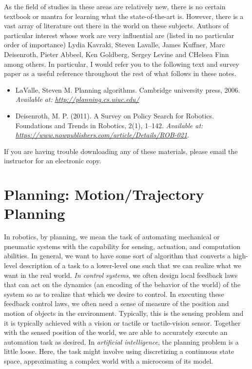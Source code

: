 As the field of studies in these areas are relatively new, there is no certain textbook or mantra for learning what the state-of-the-art is. However, there is a vast array of literature out there in the world on these subjects. Authors of particular interest whose work are very influential are (listed in no particular order of importance) Lydia Kavraki, Steven Lavalle, James Kuffner, Marc Deisenroth, Pieter Abbeel, Ken Goldberg, Sergey Levine and CHelsea Finn among others. In particular, I would refer you to the following text and survey paper as a useful reference throughout the rest of what follows in these notes.
%
\begin{itemize}
	\item LaValle, Steven M. Planning algorithms. Cambridge university press, 2006. \textit{Available at: \href{http://planning.cs.uiuc.edu/}{http://planning.cs.uiuc.edu/}}
	\item Deisenroth, M. P. (2011). A Survey on Policy Search for Robotics. Foundations and Trends in Robotics, 2(1), 1–142. \textit{Available at: \href{https://www.nowpublishers.com/article/Details/ROB-021}{https://www.nowpublishers.com/article/Details/ROB-021}}.
\end{itemize}
%
If you are having trouble downloading any of these materials, please email the instructor for an electronic copy.

\section{Planning: Motion/Trajectory Planning}

In robotics, by planning, we mean the task of automating mechanical or pneumatic systems with the capability for sensing, actuation, and computation abilities. In general, we want to have some sort of algorithm that converts a high-level description of a task to a lower-level one such that we can realize what we want in the real world. \textit{In control systems}, we often design local feedback laws that can act on the dynamics (an encoding of the behavior of the world) of the system so as to realize that which we desire to control. In executing these feedback control laws, we often need a sense of measure of the position and motion of objects in the environment. Typically, this is the sensing problem and it is typically achieved with a vision or tactile or tactile-vision sensor.  Together with the sensed position of the world, we are able to accurately execute an automation task as desired. In \textit{artificial intelligence}, the planning problem is a little loose. Here, the task might involve using discretizing a continuous state space, approximating a complex world with a microcosm of its model.   

